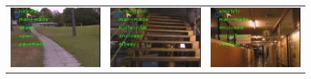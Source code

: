 \documentclass[letterpaper, 10 pt, conference]{ieeeconf}  %
\begin{document}
\newcommand{\scaleVal}{0.28}
\begin{figure}
 \begin{tabular*}{\textwidth}{ccc}
  \includegraphics[scale=\scaleVal]{1-outdoor} &
  \includegraphics[scale=\scaleVal]{2-stairs} &
  \includegraphics[scale=\scaleVal]{3-indoor} \\

\end{tabular*}
\end{figure}
\end{document}
